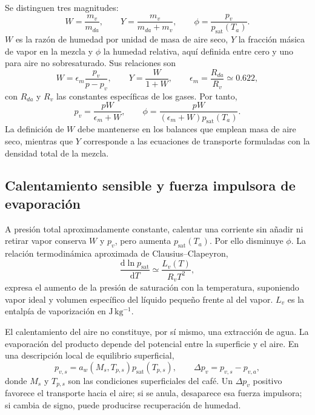 Se distinguen tres magnitudes:
\begin{equation}
W=\frac{m_v}{m_{da}},
\qquad
Y=\frac{m_v}{m_{da}+m_v},
\qquad
\phi=\frac{p_v}{p_{\mathrm{sat}}(T_a)}.
\label{eq:variables_humedad_aire}
\end{equation}
$W$ es la razón de humedad por unidad de masa de aire seco, $Y$ la fracción másica de vapor en la mezcla y $\phi$ la humedad relativa, aquí definida entre cero y uno para aire no sobresaturado. Sus relaciones son
\begin{equation}
W=\epsilon_m\frac{p_v}{p-p_v},
\qquad
Y=\frac{W}{1+W},
\qquad
\epsilon_m=\frac{R_{da}}{R_v}\simeq 0.622,
\label{eq:razon_humedad}
\end{equation}
con $R_{da}$ y $R_v$ las constantes específicas de los gases. Por tanto,
\begin{equation}
p_v=\frac{pW}{\epsilon_m+W},
\qquad
\phi=\frac{pW}{(\epsilon_m+W)p_{\mathrm{sat}}(T_a)}.
\label{eq:conversion_psicrometrica}
\end{equation}
La definición de $W$ debe mantenerse en los balances que emplean masa de aire seco, mientras que $Y$ corresponde a las ecuaciones de transporte formuladas con la densidad total de la mezcla.

\subsection{Calentamiento sensible y fuerza impulsora de evaporación}

A presión total aproximadamente constante, calentar una corriente sin añadir ni retirar vapor conserva $W$ y $p_v$, pero aumenta $p_{\mathrm{sat}}(T_a)$. Por ello disminuye $\phi$. La relación termodinámica aproximada de Clausius--Clapeyron,
\begin{equation}
\frac{\mathrm{d}\ln p_{\mathrm{sat}}}{\mathrm{d}T}
\simeq\frac{L_v(T)}{R_vT^2},
\label{eq:clausius_clapeyron}
\end{equation}
expresa el aumento de la presión de saturación con la temperatura, suponiendo vapor ideal y volumen específico del líquido pequeño frente al del vapor. $L_v$ es la entalpía de vaporización en $\mathrm{J\,kg^{-1}}$.

El calentamiento del aire no constituye, por sí mismo, una extracción de agua. La evaporación del producto depende del potencial entre la superficie y el aire. En una descripción local de equilibrio superficial,
\begin{equation}
p_{v,s}=a_w(M_s,T_{p,s})p_{\mathrm{sat}}(T_{p,s}),
\qquad
\Delta p_v=p_{v,s}-p_{v,a},
\label{eq:potencial_evaporacion}
\end{equation}
donde $M_s$ y $T_{p,s}$ son las condiciones superficiales del café. Un $\Delta p_v$ positivo favorece el transporte hacia el aire; si se anula, desaparece esa fuerza impulsora; si cambia de signo, puede producirse recuperación de humedad.


